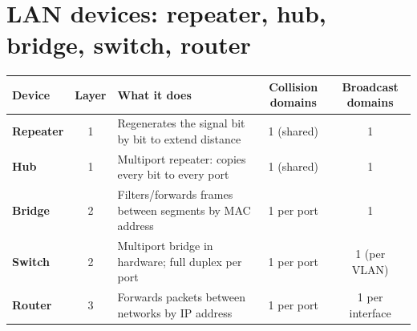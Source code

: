 \documentclass[10pt]{article}
\begin{document}
\section{LAN devices: repeater, hub, bridge, switch, router}

\begin{center}\small
\begin{tabularx}{\linewidth}{@{}>{\bfseries}lcXcc@{}}
\toprule
Device & Layer & What it does & Collision domains & Broadcast domains\\\midrule
Repeater & 1 & Regenerates the signal bit by bit to extend distance & 1 (shared) & 1\\
Hub & 1 & Multiport repeater: copies every bit to every port & 1 (shared) & 1\\
Bridge & 2 & Filters/forwards frames between segments by MAC address & 1 per port & 1\\
Switch & 2 & Multiport bridge in hardware; full duplex per port & 1 per port & 1 (per VLAN)\\
Router & 3 & Forwards packets between networks by IP address & 1 per port & 1 per interface\\
\bottomrule
\end{tabularx}
\end{center}
\end{document}
